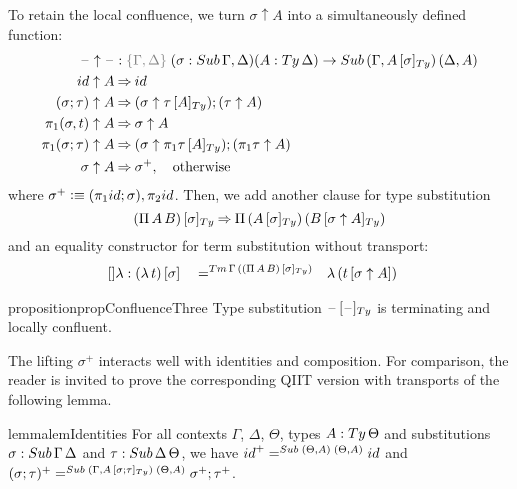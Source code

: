 \documentclass[a4paper,UKenglish,numberwithinsect,cleveref,thm-restate]{lipics-v2021}
\newcommand{\danger}{\marginpar[\hfill\dbend]{\dbend\hfill}}
\begin{document}
To retain the local confluence, we turn $\sigma \uparrow A$ into a simultaneously defined function:
\begin{alignat}{3}
  \blank\uparrow \blank & : \implicit{\Gamma, \Delta}\; (\sigma : \Sub\,\Gamma,\Delta) (A : \Ty\,\Delta) \to \Sub\,(\Gamma, \subTy{A}{\sigma})\, (\Delta, A) \label{eq:type-of-lifting} \\
\idS                \uparrow A & \reduce \idS \nonumber \\
(\sigma ; \tau)     \uparrow A & \reduce (\sigma \uparrow \subTy{\tau}{A} ) ; (\tau \uparrow A) \nonumber \\
\pi_1(\sigma, t)    \uparrow A & \reduce \sigma \uparrow A \nonumber \\
\pi_1(\sigma; \tau) \uparrow A & \reduce (\sigma \uparrow \subTy{\pi_1 \tau}{A}) ; (\pi_1 \tau \uparrow A)\nonumber \\
\sigma              \uparrow A & \reduce \sigma^+ , \quad \text{otherwise} \nonumber
\end{alignat}
where $\sigma^+ \defeq (\pi_1\idS ; \sigma), \pi_2\idS$.
Then, we add another clause for type substitution
\begin{equation*}
  \subTy{(\Pi\,A\,B)}{\sigma} \reduce \Pi\,(\subTy{A}{\sigma})\,(\subTy{B}{\sigma\uparrow A}) %
\end{equation*}
and an equality constructor for term substitution without transport:
\begin{alignat}{5}
  \mathsf{[]\lambda} :{} & \sub{(\lambda\,t)}{\sigma} && =^{\Tm\,\Gamma\,(\subTy{(\Pi\,A\,B)}{\sigma})} && \lambda\,(\sub{t}{\sigma \uparrow A}) \nonumber
\end{alignat}

\begin{restatable}{proposition}{propConfluenceThree}\label{prop:local-confluence-3}
  Type substitution $\subTy{\blank}{\blank}$ is terminating and locally confluent.
    \danger
\end{restatable}

The lifting $\sigma^+$ interacts well with identities and composition.
For comparison, the reader is invited to prove the corresponding QIIT version with transports of the following lemma.
%
\begin{restatable}{lemma}{lemIdentities}\label{lem:lifting}
  For all contexts $\Gamma$, $\Delta$, $\Theta$, types $A : \Ty\,\Theta$ and substitutions $\sigma : \Sub\,\Gamma\,\Delta$ and $\tau : \Sub\,\Delta\,\Theta$, we have $\idS^+ =^{\Sub\;(\Theta, A)\;(\Theta, A)} \idS$ and $(\sigma; \tau)^+     =^{\Sub\;(\Gamma, \subTy{A}{\sigma; \tau})\;(\Theta, A)} \sigma^+ ; \tau^+$.
\end{restatable}
\end{document}
